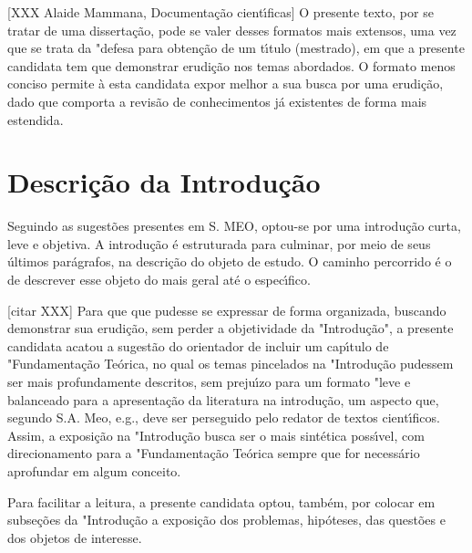 \documentclass[
12pt,		%
openright,	%
twoside,  %
a4paper,			%
chapter=TITLE,		%
english,			%
french,				%
spanish,			%
brazil				%
]{USPSC-classe/USPSC}
\begin{document}
[XXX Alaide Mammana, Documenta\c{c}\~ao cient\'{\i}ficas]
O presente texto, por se tratar de uma disserta\c{c}\~ao, pode se valer desses formatos mais extensos, uma vez que se trata da "defesa para obten\c{c}\~ao de um t\'{\i}tulo (mestrado), em que a presente candidata tem que demonstrar erudi\c{c}\~ao nos temas abordados. O formato menos conciso permite \`a esta candidata expor melhor a sua busca por uma erudi\c{c}\~ao, dado que comporta a revis\~ao de conhecimentos j\'a existentes de forma mais estendida.




\section[Descri\c{c}\~ao da Introdu\c{c}\~ao]{Descri\c{c}\~ao da Introdu\c{c}\~ao}\label{Descri\c{c}\~ao da Introdu\c{c}\~ao}
Seguindo as sugest\~oes presentes em S. MEO, optou-se por uma introdu\c{c}\~ao curta, leve e objetiva. A introdu\c{c}\~ao \'e estruturada para culminar, por meio de seus \'ultimos par\'agrafos, na descri\c{c}\~ao do objeto de estudo. O caminho percorrido \'e o de descrever esse objeto do mais geral at\'e o espec\'{\i}fico. 




[citar XXX]
Para que que pudesse se expressar de forma organizada, buscando demonstrar sua erudi\c{c}\~ao, sem perder a objetividade da "Introdu\c{c}\~ao", a presente candidata acatou a sugest\~ao do orientador de incluir um cap\'{\i}tulo de "Fundamenta\c{c}\~ao Te\'orica, no qual os temas pincelados na "Introdu\c{c}\~ao pudessem ser mais profundamente descritos, sem preju\'{\i}zo para um formato "leve e balanceado para a apresenta\c{c}\~ao da literatura na introdu\c{c}\~ao, um aspecto que, segundo S.A. Meo, e.g., deve ser perseguido pelo redator de textos cient\'{\i}ficos. Assim, a exposi\c{c}\~ao na "Introdu\c{c}\~ao busca ser o mais sint\'etica poss\'{\i}vel, com direcionamento para a "Fundamenta\c{c}\~ao Te\'orica sempre que for necess\'ario aprofundar em algum conceito. 




Para facilitar a leitura, a presente candidata optou, tamb\'em, por colocar em subse\c{c}\~oes da "Introdu\c{c}\~ao a exposi\c{c}\~ao dos problemas, hip\'oteses, das quest\~oes e dos objetos de interesse.
\end{document}
